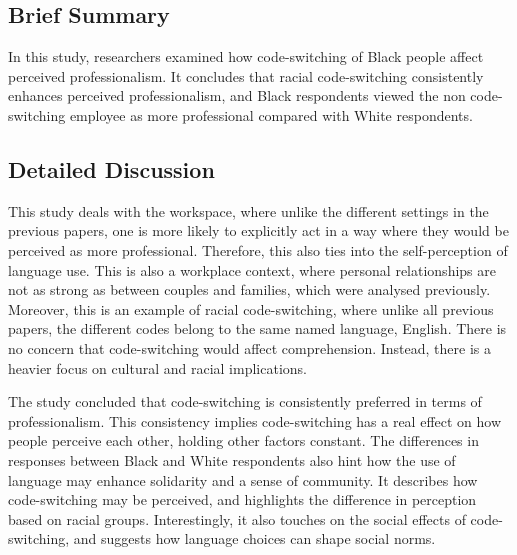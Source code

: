 \documentclass[12pt]{article}
\begin{document}
\subsection{Brief Summary}

In this study, researchers examined how code-switching of Black people affect perceived professionalism. It concludes that racial code-switching consistently enhances perceived professionalism, and Black respondents viewed the non code-switching employee as more professional compared with White respondents.

\subsection{Detailed Discussion}

This study deals with the workspace, where unlike the different settings in the previous papers, one is more likely to explicitly act in a way where they would be perceived as more professional. Therefore, this also ties into the self-perception of language use. This is also a workplace context, where personal relationships are not as strong as between couples and families, which were analysed previously. Moreover, this is an example of racial code-switching, where unlike all previous papers, the different codes belong to the same named language, English. There is no concern that code-switching would affect comprehension. Instead, there is a heavier focus on cultural and racial implications.

The study concluded that code-switching is consistently preferred in terms of professionalism. This consistency implies code-switching has a real effect on how people perceive each other, holding other factors constant. The differences in responses between Black and White respondents also hint how the use of language may enhance solidarity and a sense of community. It describes how code-switching may be perceived, and highlights the difference in perception based on racial groups. Interestingly, it also touches on the social effects of code-switching, and suggests how language choices can shape social norms.

{}

\end{document}
